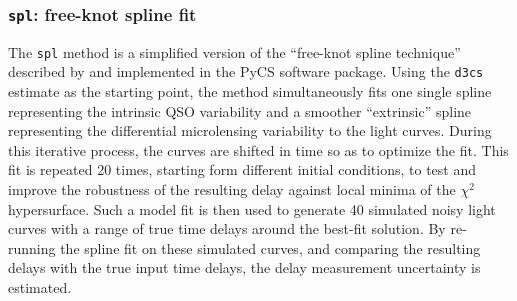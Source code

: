 \documentclass[traditabstract]{aa}
\begin{document}
\subsubsection{{\tt spl}: free-knot spline fit}

The {\tt spl} method is a simplified version of the ``free-knot spline
technique'' described by \citet{pycs} and implemented in the PyCS
software package. Using the {\tt d3cs} estimate as the starting point, the
method simultaneously fits one single spline representing the
intrinsic QSO variability and a smoother ``extrinsic'' spline
representing the differential microlensing variability to the light
curves. During this iterative process, the curves are shifted in time
so as to optimize the fit. This fit is repeated 20 times, starting form
different initial conditions, to test and improve the robustness of
the resulting delay against local minima of the $\chi^2$
hypersurface. Such a model fit is then used to generate 40 simulated
noisy light curves with a range of true time delays around the
best-fit solution. By re-running the spline fit on these simulated
curves, and comparing the resulting delays with the true input time
delays, the delay measurement uncertainty is estimated.
\end{document}
